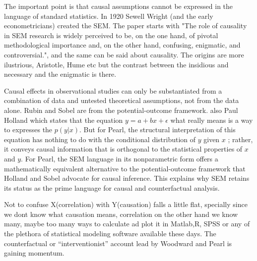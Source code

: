 \documentclass[onecollarge,runningheads]{svjour2}
\begin{document}
The important point is that causal assumptions cannot be expressed in the language of standard statistics. In 1920 Sewell Wright (and the early econometricians) created the SEM.
The paper starts with "The role of causality in SEM research is widely perceived to be, on the one hand, of pivotal
methodological importance and, on the other hand, confusing, enigmatic, and controversial.", and the same can be said about causality. The origins are more ilustrious, Aristotle, Hume etc but the contrast between the insidious and necessary and the enigmatic is there. 

Causal effects in observational studies can only be substantiated from a combination of data and untested theoretical assumptions, not from the data alone.
Rubin and Sobel are from the potential-outcome framework. also Paul Holland which states that the equation $y = a +bx+ \epsilon$ what really means is a way to expresses the $p(y|x)$. But for Pearl, the  structural interpretation of this equation has nothing to do with the conditional distribution of ${y}$ given  ${x}$ ; rather, it conveys causal information that is orthogonal to the statistical properties of  ${x}$  and  ${y}$. For Pearl, the SEM language in its nonparametric form offers a mathematically equivalent alternative to the potential-outcome framework that Holland and Sobel advocate for causal inference. This explains why SEM retains its status as the prime language for causal and counterfactual analysis.

\citep{wiedermann2016statistics}
Not to confuse X(correlation) with Y(causation) falls a little flat, specially since we dont know what causation means, correlation on the other hand we know many, maybe too many ways to calculate ad plot it in Matlab,R, SPSS or any of the plethora of statistical modeling software available these days. 
The counterfactual or “interventionist” account lead by Woodward and Pearl is gaining momentum.
\end{document}
